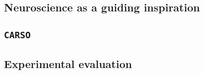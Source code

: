 

\subsection{Neuroscience as a guiding inspiration}

\subsection{\texttt{CARSO}}


\subsection{Experimental evaluation}
